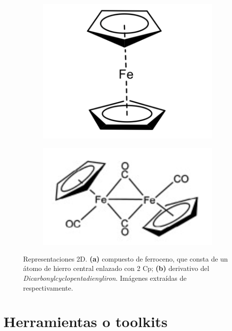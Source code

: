\begin{figure}[h!]
\centering
\begin{subfigure}{.5\textwidth}
  \centering
  \includegraphics[width=.7\linewidth]{imagenes/estado_arte/teoria/ferroceno.png}
  \caption{}
\end{subfigure}%
\begin{subfigure}{.5\textwidth}
  \centering
  \includegraphics[width=.9\linewidth]{imagenes/estado_arte/teoria/derivativo_ferreoceno.png}
  \caption{}
\end{subfigure}
\caption{Representaciones 2D. \textbf{(a)} compuesto de ferroceno, que consta de un átomo de hierro central enlazado con 2 Cp; \textbf{(b)} derivativo del \textit{Dicarbonylcyclopentadienyliron}. Imágenes extraídas de \cite{libreTextMetalocenos, artero_hydrogen_2008} respectivamente.}
\label{fig:metalocenos_ejemplos}
\end{figure}

\section{Herramientas o toolkits} \label{toolkits}

